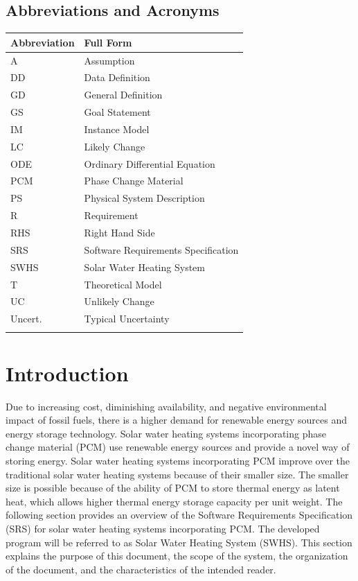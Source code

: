 \documentclass[12pt]{article}
\begin{document}
\subsection{Abbreviations and Acronyms}
\label{Sec:TAbbAcc}
\begin{longtable*}{l l}
\toprule
Abbreviation & Full Form
\\
\midrule
A & Assumption
\\
DD & Data Definition
\\
GD & General Definition
\\
GS & Goal Statement
\\
IM & Instance Model
\\
LC & Likely Change
\\
ODE & Ordinary Differential Equation
\\
PCM & Phase Change Material
\\
PS & Physical System Description
\\
R & Requirement
\\
RHS & Right Hand Side
\\
SRS & Software Requirements Specification
\\
SWHS & Solar Water Heating System
\\
T & Theoretical Model
\\
UC & Unlikely Change
\\
Uncert. & Typical Uncertainty
\\
\bottomrule
\label{Table:TAbbAcc}
\end{longtable*}
\section{Introduction}
\label{Sec:Intro}
Due to increasing cost, diminishing availability, and negative environmental impact of fossil fuels, there is a higher demand for renewable energy sources and energy storage technology. Solar water heating systems incorporating phase change material (PCM) use renewable energy sources and provide a novel way of storing energy. Solar water heating systems incorporating PCM improve over the traditional solar water heating systems because of their smaller size. The smaller size is possible because of the ability of PCM to store thermal energy as latent heat, which allows higher thermal energy storage capacity per unit weight.
The following section provides an overview of the Software Requirements Specification (SRS) for solar water heating systems incorporating PCM. The developed program will be referred to as Solar Water Heating System (SWHS). This section explains the purpose of this document, the scope of the system, the organization of the document, and the characteristics of the intended reader.
\end{document}
